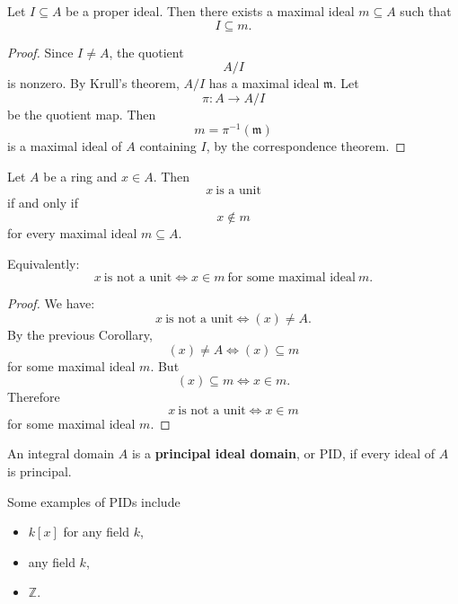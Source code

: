 \documentclass[11pt]{article}
\begin{document}
\begin{cor}
    Let $I \subseteq A$ be a proper ideal. 
    Then there exists a maximal ideal $m \subseteq A$ such 
    that 
    \[
        I \subseteq m. 
    \]
\end{cor}
\begin{proof}
    Since $I \neq A$, the quotient 
    \[
        A/I
    \]
    is nonzero. By Krull's theorem, $A/I$ has a maximal ideal 
    $\mathfrak m$. 
    Let 
    \[
        \pi : A \to A/I   
    \]
    be the quotient map. Then 
    \[
        m = \pi^{-1}(\mathfrak m)
    \]
    is a maximal ideal of $A$ containing $I$, by 
    the correspondence theorem. 
\end{proof}
\begin{cor}
    Let $A$ be a ring and $x \in A$. Then 
    \[
        x \ \text{is a unit}
    \]
    if and only if 
    \[
        x \not\in m
    \]
    for every maximal ideal $m \subseteq A$. 

    Equivalently: 
    \[
        x \ \text{is not a unit} 
        \Leftrightarrow x \in m \ \text{for some maximal ideal} \ 
        m. 
    \]
\end{cor}
\begin{proof}
    We have: 
    \[
        x \ \text{is not a unit} \Leftrightarrow 
        (x) \neq A. 
    \]
    By the previous Corollary, 
    \[
        (x) \neq A \Leftrightarrow (x) \subseteq m
    \]
    for some maximal ideal $m$. 
    But 
    \[
        (x) \subseteq m \Leftrightarrow x \in m. 
    \]
    Therefore 
    \[
        x \ \text{is not a unit} 
        \Leftrightarrow x \in m
    \]
    for some maximal ideal $m$. 
\end{proof}

\begin{defn}[PID]
    An integral domain $A$ is a 
    \textbf{principal ideal domain}, or PID, if every ideal 
    of $A$ is principal. 
\end{defn}
\begin{ex}
    Some examples of PIDs include 
    \begin{itemize}
        \item $k[x]$ for any field $k$, 
        \item any field $k$, 
        \item $\mathbb Z$. 
    \end{itemize}
\end{ex}
\end{document}
